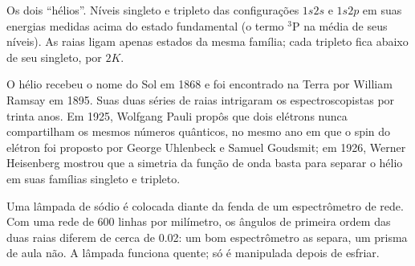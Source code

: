 \begin{omfigure}

{\small Os dois ``hélios''. Níveis singleto e tripleto das configurações
$1s2s$ e $1s2p$ em suas energias medidas acima do estado fundamental (o
termo ${}^3$P na média de seus níveis). As raias ligam apenas estados da
mesma família; cada tripleto fica abaixo de seu singleto, por $2K$.}
\end{omfigure}

\begin{history}
O hélio recebeu o nome do Sol em 1868 e foi encontrado na Terra por William
Ramsay em 1895. Suas duas séries de raias intrigaram os espectroscopistas
por trinta anos. Em 1925, Wolfgang Pauli propôs que dois elétrons nunca
compartilham os mesmos números quânticos, no mesmo ano em que o spin do
elétron foi proposto por George Uhlenbeck e Samuel Goudsmit; em 1926, Werner
Heisenberg mostrou que a simetria da função de onda basta para separar o
hélio em suas famílias singleto e tripleto.
\end{history}

\begin{inthelab}
Uma lâmpada de sódio é colocada diante da fenda de um espectrômetro de rede.
Com uma rede de 600 linhas por milímetro, os ângulos de primeira ordem das
duas raias diferem de cerca de \num{0.02}\textdegree: um bom espectrômetro as
separa, um prisma de aula não. A lâmpada funciona quente; só é manipulada
depois de esfriar.
\end{inthelab}

